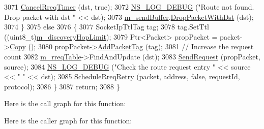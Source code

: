 \begin{DoxyCode}
3071       \hyperlink{classns3_1_1dsr_1_1DsrRouting_ad489fa602b093c8336cf4143ed60e429}{CancelRreqTimer} (dst, \textcolor{keyword}{true});
3072       \hyperlink{group__logging_ga413f1886406d49f59a6a0a89b77b4d0a}{NS\_LOG\_DEBUG} (\textcolor{stringliteral}{"Route not found. Drop packet with dst "} << dst);
3073       \hyperlink{classns3_1_1dsr_1_1DsrRouting_a887ae39d7060171753c0605d5c120549}{m\_sendBuffer}.\hyperlink{classns3_1_1dsr_1_1DsrSendBuffer_af20f9ff303a1099f3568254d4c58e829}{DropPacketWithDst} (dst);
3074     \}
3075   \textcolor{keywordflow}{else}
3076     \{
3077       SocketIpTtlTag tag;
3078       tag.SetTtl ((uint8\_t)\hyperlink{classns3_1_1dsr_1_1DsrRouting_acf9cc5a2ae446403b8b57f3340fac178}{m\_discoveryHopLimit});
3079       Ptr<Packet> propPacket = packet->\hyperlink{classns3_1_1Packet_a5d5c70802a5f77fc5f0001e0cfc1898b}{Copy} ();
3080       propPacket->\hyperlink{classns3_1_1Packet_a7400b8655852f5271c5957250d0141af}{AddPacketTag} (tag);
3081       \textcolor{comment}{// Increase the request count}
3082       \hyperlink{classns3_1_1dsr_1_1DsrRouting_ae9ec27743735fa2d59cc5190961d1942}{m\_rreqTable}->FindAndUpdate (dst);
3083       \hyperlink{classns3_1_1dsr_1_1DsrRouting_a21496638c09e75ea310e876135d0bf64}{SendRequest} (propPacket, source);
3084       \hyperlink{group__logging_ga413f1886406d49f59a6a0a89b77b4d0a}{NS\_LOG\_DEBUG} (\textcolor{stringliteral}{"Check the route request entry "} << source << \textcolor{stringliteral}{" "} << dst);
3085       \hyperlink{classns3_1_1dsr_1_1DsrRouting_a056b38f3af6c2992be89b8fc5cb15448}{ScheduleRreqRetry} (packet, address, \textcolor{keyword}{false}, requestId, protocol);
3086     \}
3087   \textcolor{keywordflow}{return};
3088 \}
\end{DoxyCode}


Here is the call graph for this function\+:




Here is the caller graph for this function\+:


